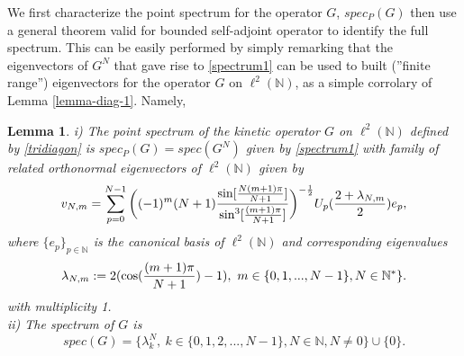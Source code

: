 \documentclass[a4paper,11pt,twoside]{article}
\numberwithin{equation}{section}
\newtheorem{lemma}[Theorem]{Lemma}
\theoremstyle{nonumberplain}
\newcounter{and}
\begin{document}
We first characterize the point spectrum for the operator $G$, $spec_P(G)$ then use a general theorem valid for bounded self-adjoint operator to identify the full spectrum. This can be easily performed by simply remarking that the eigenvectors of $G^N$ that gave rise to \eqref{spectrum1} can be used to built (''finite range'') eigenvectors for the operator $G$ on $\ell^2(\mathbb{N})$, as a simple corrolary of Lemma \ref{lemma-diag-1}. Namely, 
\begin{lemma}\label{lemma-spectrum-full}
i) The point spectrum of the kinetic operator $G$ on $\ell^2(\mathbb{N})$ defined by \eqref{tridiagon} is $spec_P(G)=spec(G^N)$ given by \eqref{spectrum1} with family of related orthonormal eigenvectors of $\ell^2(\mathbb{N})$ given by 
\begin{equation}
v_{N,m}=\sum_{p=0}^{N-1}\bigg((-1)^m(N+1){{ \sin[{{N(m+1)\pi }\over{N+1 }}  ]}\over {\sin^3[{{(m+1)\pi }\over{N+1 }} ] }} \bigg)^{-{{1}\over{2}}}  U_p({{2+\lambda_{N,m}}\over{2}})e_p\label{eigenvektor},
\end{equation}
where $\{e_p\}_{p\in\mathbb{N}}$ is the canonical basis of $\ell^2(\mathbb{N})$ and corresponding eigenvalues
\begin{equation}
\lambda_{N,m}:=2(\cos({{(m+1)\pi}\over{N+1}})-1), \ m\in\{0,1,...,N-1\}, N\in\mathbb{N}^*\}.
\end{equation}
with multiplicity 1.\\
ii) The spectrum of $G$ is 
\begin{equation}
spec(G)=\{\lambda^N_k,\ k\in\{0,1,2,...,N-1\}, N\in\mathbb{N}, N\ne0 \}\cup\{0\}\label{spectrum-full}.
\end{equation}
\end{lemma}
\end{document}
